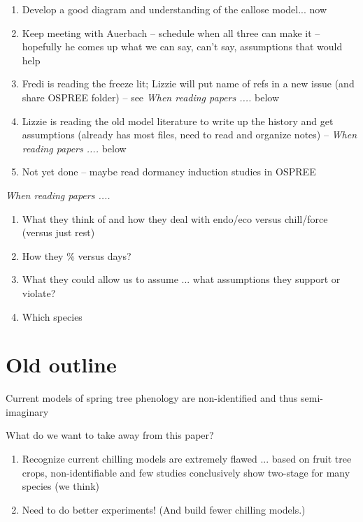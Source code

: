 \documentclass[11pt,letter]{article}
\begin{document}
\begin{enumerate}
\item Develop a good diagram and understanding of the callose model... now
\item Keep meeting with Auerbach -- schedule when all three can make it -- hopefully he comes up what we can say, can't say, assumptions that would help
\item Fredi is reading the freeze lit; Lizzie will put name of refs in a new issue (and share OSPREE folder) -- see \emph{When reading papers .... } below
\item Lizzie is reading the old model literature to write up the history and get assumptions (already has most files, need to read and organize notes) -- \emph{When reading papers .... } below
\item Not yet done -- maybe read dormancy induction studies in OSPREE 
\end{enumerate}

\emph{When reading papers .... }
\begin{enumerate}
\item What they think of and how they deal with endo/eco versus chill/force (versus just rest)
\item How they \% versus days?
\item What they could allow us to assume ... what assumptions they support or violate?
\item Which species
\end{enumerate}

\section{Old outline} %

Current models of spring tree phenology are non-identified and thus semi-imaginary

What do we want to take away from this paper?
\begin{enumerate}
\item Recognize current chilling models are extremely flawed ... based on fruit tree crops, non-identifiable and few studies conclusively show two-stage for many species (we think) 
\item Need to do better experiments! (And build fewer chilling models.)
\end{enumerate}
\end{document}
